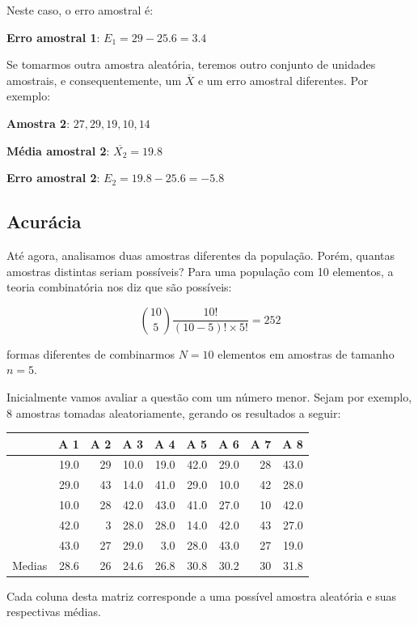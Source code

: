 \documentclass[
]{book}
\begin{document}
Neste caso, o erro amostral é:

\textbf{Erro amostral 1}: \(E_1 = 29 - 25.6 = 3.4\)

Se tomarmos outra amostra aleatória, teremos outro conjunto de unidades amostrais, e consequentemente, um \(\overline{X}\) e um erro amostral diferentes. Por exemplo:

\textbf{Amostra 2}: \(27, 29, 19, 10, 14\)

\textbf{Média amostral 2}: \(\overline{X_2} = 19.8\)

\textbf{Erro amostral 2}: \(E_2 = 19.8 - 25.6 = -5.8\)

\hypertarget{acuruxe1cia}{%
\subsection{Acurácia}\label{acuruxe1cia}}

Até agora, analisamos duas amostras diferentes da população. Porém, quantas amostras distintas seriam possíveis? Para uma população com 10 elementos, a teoria combinatória nos diz que são possíveis:

\[{{10}\choose{5}} \frac{10!}{(10-5)! \times 5!} = 252\]

formas diferentes de combinarmos \(N = 10\) elementos em amostras de tamanho \(n = 5\).

Inicialmente vamos avaliar a questão com um número menor. Sejam por exemplo, 8 amostras tomadas aleatoriamente, gerando os resultados a seguir:

\begin{tabular}{l|r|r|r|r|r|r|r|r}
\hline
  & A 1 & A 2 & A 3 & A 4 & A 5 & A 6 & A 7 & A 8\\
\hline
 & 19.0 & 29 & 10.0 & 19.0 & 42.0 & 29.0 & 28 & 43.0\\
\hline
 & 29.0 & 43 & 14.0 & 41.0 & 29.0 & 10.0 & 42 & 28.0\\
\hline
 & 10.0 & 28 & 42.0 & 43.0 & 41.0 & 27.0 & 10 & 42.0\\
\hline
 & 42.0 & 3 & 28.0 & 28.0 & 14.0 & 42.0 & 43 & 27.0\\
\hline
 & 43.0 & 27 & 29.0 & 3.0 & 28.0 & 43.0 & 27 & 19.0\\
\hline
Medias & 28.6 & 26 & 24.6 & 26.8 & 30.8 & 30.2 & 30 & 31.8\\
\hline
\end{tabular}

Cada coluna desta matriz corresponde a uma possível amostra aleatória e suas respectivas médias.
\end{document}
